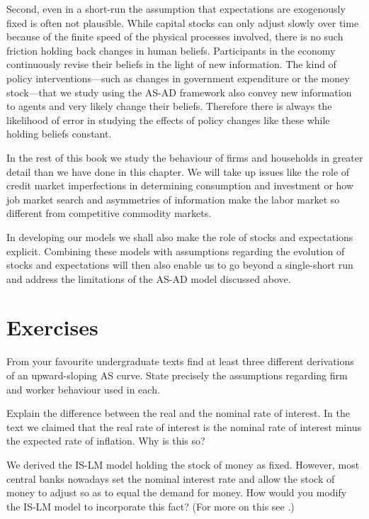\documentclass[11pt,reqno,openany]{amsbook}
\begin{document}
Second, even in a short-run the assumption that expectations
are exogenously fixed is often not plausible. While
capital stocks can only adjust slowly over time because of the
finite speed of the physical processes involved, there is no
such friction holding back changes in human beliefs.
Participants in the economy continuously revise their
beliefs in the light of new information. The kind of policy
interventions---such as changes in government expenditure or
the money stock---that we study using the AS-AD framework
also convey new information to agents and very likely change
their beliefs. Therefore there is always the likelihood of
error in studying the effects of policy changes like these
while holding beliefs constant. 

In the rest of this book we  study the behaviour of
firms and households in greater detail
than we have done in this chapter. We will take up issues
like the role of credit market imperfections in determining
consumption and investment or how job market search and
asymmetries of information make the labor market so
different from competitive commodity markets. 

In developing our models we shall also make the role of
stocks and expectations explicit. Combining these models
with assumptions regarding the evolution of stocks and
expectations will then also enable us to go beyond a
single-short run and address the limitations of the AS-AD
model discussed above.

\section*{Exercises}
\begin{excr}
  From your favourite undergraduate texts find at least
  three different derivations of an upward-sloping AS curve.
  State precisely the assumptions regarding firm and worker
  behaviour used in each.
\end{excr}
\begin{excr}
  Explain the difference between the real and the nominal
  rate of interest. In the text we claimed that the real
  rate of interest is the nominal rate of interest minus the
  expected rate of inflation. Why is this so?
\end{excr}
\begin{excr}
  We derived the IS-LM model holding the stock of money as
  fixed. However, most central banks nowadays set the
  nominal interest rate and allow the stock of money to
  adjust so as to equal the demand for money. How would you
  modify the IS-LM model to incorporate this fact? (For more
  on this see \cite{romer2000keynesian}.)
\end{excr}
\end{document}
